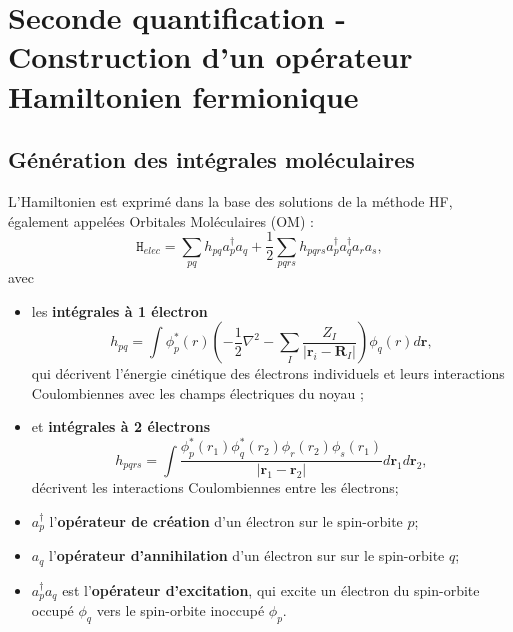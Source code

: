     \hypertarget{seconde-quantification---construction-dun-opuxe9rateur-hamiltonien-fermionique}{%
\section{Seconde quantification - Construction d'un opérateur
Hamiltonien
fermionique}\label{seconde-quantification---construction-dun-opuxe9rateur-hamiltonien-fermionique}}

\hypertarget{guxe9nuxe9ration-des-intuxe9grales-moluxe9culaires}{%
\subsection{Génération des intégrales moléculaires}\label{guxe9nuxe9ration-des-intuxe9grales-moluxe9culaires}}

L'Hamiltonien est exprimé dans la base des solutions de la méthode HF,
également appelées Orbitales Moléculaires (OM) : 
\begin{equation}
\mathtt{H}_{elec}=\sum_{pq} h_{pq} a^{\dagger}_p a_q + 
\frac{1}{2} \sum_{pqrs} h_{pqrs}  a^{\dagger}_p a^{\dagger}_q a_r  a_s,
\end{equation} 
avec 
\begin{itemize}
\item les \textbf{intégrales à 1 électron}
\begin{equation}
h_{pq} = \int \phi^*_p(r) \left( -\frac{1}{2} \nabla^2 - \sum_{I} \frac{Z_I}{|\mathbf{r}_i-\mathbf{R}_I|} \right)   \phi_q(r)d\mathbf{r},
\end{equation} 
qui décrivent l'énergie cinétique des électrons
individuels et leurs interactions Coulombiennes avec les champs
électriques du noyau ; 
\item et \textbf{intégrales à 2 électrons}
\begin{equation}
h_{pqrs} = \int \frac{\phi^*_p(r_1)  \phi^*_q(r_2) \phi_r(r_2)  \phi_s(r_1)}{|\mathbf{r}_1-\mathbf{r}_2|}d\mathbf{r}_1d\mathbf{r}_2,
\end{equation} 
décrivent les interactions Coulombiennes entre les
électrons; 
\item $a^\dagger_p$ l'\textbf{opérateur de création} d'un
électron sur le spin-orbite $p$; 
\item  $a_q$ l'\textbf{opérateur d'annihilation} d'un électron sur sur le spin-orbite $q$; 
\item $a^{\dagger}_p a_q $ est l'\textbf{opérateur d'excitation}, qui
excite un électron du spin-orbite occupé $\phi_q$ vers le spin-orbite
inoccupé $\phi_p$.
\end{itemize}

